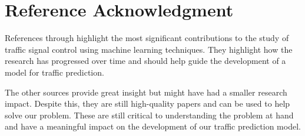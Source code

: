 \documentclass[conference]{IEEEtran}
\begin{document}
\section*{Reference Acknowledgment}
References \cite{1} through \cite{15} highlight the most significant contributions to the study of traffic signal control using machine learning techniques. They highlight how the research has progressed over time and should help guide the development of a model for traffic prediction. 

The other sources provide great insight but might have had a smaller research impact. Despite this, they are still high-quality papers and can be used to help solve our problem. These are still critical to understanding the problem at hand and have a meaningful impact on the development of our traffic prediction model. 
\end{document}
